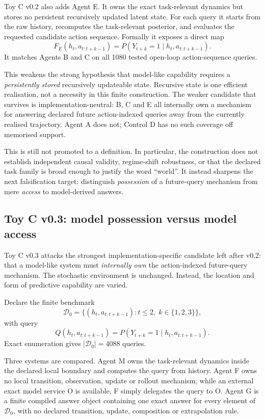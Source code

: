 \documentclass[10pt]{article}
\begin{document}
Toy C v0.2 also adds Agent E. It owns the exact task-relevant dynamics but stores no persistent recursively updated latent state. For each query it starts from the raw history, recomputes the task-relevant posterior, and evaluates the requested candidate action sequence. Formally it exposes a direct map
\[
F_E(h_t,a_{t:t+k-1})
=
P(Y_{t+k}=1\mid h_t,a_{t:t+k-1}).
\]
It matches Agents B and C on all 1080 tested open-loop action-sequence queries.

This weakens the strong hypothesis that model-like capability requires a \emph{persistently stored} recursively updateable state. Recursive state is one efficient realisation, not a necessity in this finite construction. The weaker candidate that survives is implementation-neutral: B, C and E all internally own a mechanism for answering declared future action-indexed queries away from the currently realised trajectory. Agent A does not; Control D has no such coverage off memorised support.

This is still not promoted to a definition. In particular, the construction does not establish independent causal validity, regime-shift robustness, or that the declared task family is broad enough to justify the word ``world''. It instead sharpens the next falsification target: distinguish \emph{possession} of a future-query mechanism from mere \emph{access} to model-derived answers.


\subsection{Toy C v0.3: model possession versus model access}

Toy C v0.3 attacks the strongest implementation-specific candidate left after v0.2: that a model-like system must \emph{internally own} the action-indexed future-query mechanism. The stochastic environment is unchanged. Instead, the location and form of predictive capability are varied.

Declare the finite benchmark
\[
\mathcal D_0
=
\{(h_t,a_{t:t+k-1}):t\le2,\;k\in\{1,2,3\}\},
\]
with query
\[
Q(h_t,a_{t:t+k-1})
=
P(Y_{t+k}=1\mid h_t,a_{t:t+k-1}).
\]
Exact enumeration gives $|\mathcal D_0|=4088$ queries.

Three systems are compared. Agent M owns the task-relevant dynamics inside the declared local boundary and computes the query from history. Agent F owns no local transition, observation, update or rollout mechanism; while an external exact model service O is available, F simply delegates the query to O. Agent G is a finite compiled answer object containing one exact answer for every element of $\mathcal D_0$, with no declared transition, update, composition or extrapolation rule.
\end{document}
